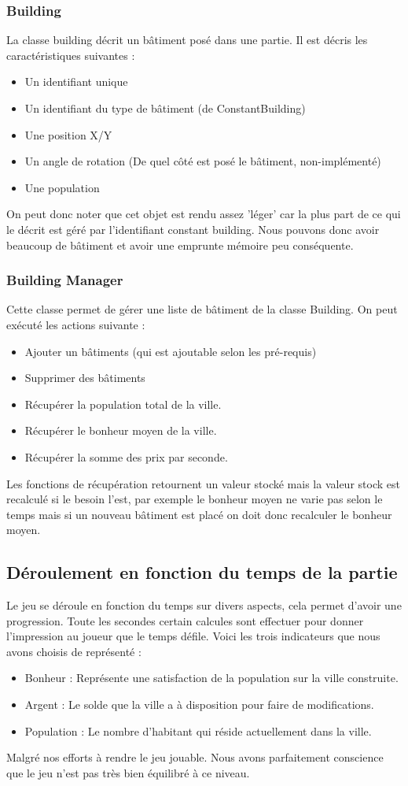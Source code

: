 \documentclass[a4paper,10pt,openany,oneside]{report}
\begin{document}
\subsubsection{Building}
La classe building décrit un bâtiment posé dans une partie. Il est décris les caractéristiques suivantes :
\begin{itemize}
	\item Un identifiant unique
	\item Un identifiant du type de bâtiment (de ConstantBuilding)
	\item Une position X/Y
	\item Un angle de rotation (De quel côté est posé le bâtiment, non-implémenté)
	\item Une population
\end{itemize}
On peut donc noter que cet objet est rendu assez 'léger' car la plus part de ce qui le décrit est géré par l'identifiant constant building. Nous pouvons donc avoir beaucoup de bâtiment et avoir une emprunte mémoire peu conséquente.

\subsubsection{Building Manager}
Cette classe permet de gérer une liste de bâtiment de la classe Building. On peut exécuté les actions suivante :
\begin{itemize}
	\item Ajouter un bâtiments (qui est ajoutable selon les pré-requis)
	\item Supprimer des bâtiments 
	\item Récupérer la population total de la ville.
	\item Récupérer le bonheur moyen de la ville.
	\item Récupérer la somme des prix par seconde.
\end{itemize}

Les fonctions de récupération retournent un valeur stocké mais la valeur stock est recalculé si le besoin l'est, par exemple le bonheur moyen ne varie pas selon le temps mais si un nouveau bâtiment est placé on doit donc recalculer le bonheur moyen.

\subsection{Déroulement en fonction du temps de la partie}
Le jeu se déroule en fonction du temps sur divers aspects, cela permet d'avoir une progression. Toute les secondes certain calcules sont effectuer pour donner l'impression au joueur que le temps défile. Voici les trois indicateurs que nous avons choisis de représenté :
\begin{itemize}
	\item Bonheur : Représente une satisfaction de la population sur la ville construite.
	\item Argent : Le solde que la ville a à disposition pour faire de modifications.
	\item Population : Le nombre d'habitant qui réside actuellement dans la ville.
\end{itemize}
Malgré nos efforts à rendre le jeu jouable. Nous avons parfaitement conscience que le jeu n'est pas très bien équilibré à ce niveau.
\end{document}
